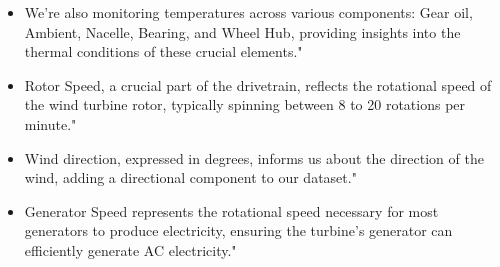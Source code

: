 \documentclass[11pt,a4paper]{article}
\begin{document}
\begin{itemize}
    \item We're also monitoring temperatures across various components: Gear oil, Ambient, Nacelle, Bearing, and Wheel Hub, providing insights into the thermal conditions of these crucial elements."
\end{itemize}

\begin{itemize}
    \item Rotor Speed, a crucial part of the drivetrain, reflects the rotational speed of the wind turbine rotor, typically spinning between 8 to 20 rotations per minute."
\end{itemize}

\begin{itemize}
    \item Wind direction, expressed in degrees, informs us about the direction of the wind, adding a directional component to our dataset."
\end{itemize}

\begin{itemize}
    \item Generator Speed represents the rotational speed necessary for most generators to produce electricity, ensuring the turbine's generator can efficiently generate AC electricity."
\end{itemize}
\end{document}
